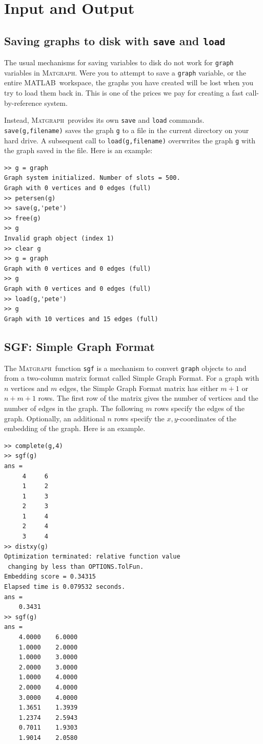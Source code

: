 \documentclass[12pt]{amsart}
\newcommand\matlab{MATLAB}
\newcommand\matgraph{\textsc{Matgraph}}
\begin{document}
\section{Input and Output}

\subsection{Saving graphs to disk with \texttt{save} and \texttt{load}}
The usual mechanisms for saving variables to disk do not work for
\verb|graph| variables in \matgraph. Were you to attempt to save a
\verb|graph| variable, or the entire \matlab\ workspace, the graphs
you have created will be lost when you try to load them back in. This
is one of the prices we pay for creating a fast call-by-reference
system. 

Instead, \matgraph\ provides its own \verb|save| and \verb|load|
commands. \verb|save(g,filename)| saves the graph \verb|g| to a file
in the current directory on your hard drive. A subsequent call to
\verb|load(g,filename)| overwrites the graph \verb|g| with the graph
saved in the file. Here is an example:
\begin{verbatim}
>> g = graph
Graph system initialized. Number of slots = 500.
Graph with 0 vertices and 0 edges (full)
>> petersen(g)
>> save(g,'pete')
>> free(g)
>> g
Invalid graph object (index 1)
>> clear g
>> g = graph
Graph with 0 vertices and 0 edges (full)
>> g
Graph with 0 vertices and 0 edges (full)
>> load(g,'pete')
>> g
Graph with 10 vertices and 15 edges (full) 
\end{verbatim}


\subsection{SGF: Simple Graph Format}
\label{sect:sgf}
The \matgraph\ function \verb|sgf| is a mechanism to convert
\verb|graph| objects to and from a two-column matrix format called
Simple Graph Format. For a graph with $n$ vertices and $m$ edges, the
Simple Graph Format matrix has either $m+1$ or $n+m+1$ rows. The first
row of the matrix gives the number of vertices and the number of edges
in the graph. The following $m$ rows specify the edges of the
graph. Optionally, an additional $n$ rows specify the
$x,y$-coordinates of the embedding of the graph. Here is an example.
\begin{verbatim}
>> complete(g,4)
>> sgf(g)
ans =
     4     6
     1     2
     1     3
     2     3
     1     4
     2     4
     3     4
>> distxy(g)
Optimization terminated: relative function value
 changing by less than OPTIONS.TolFun.
Embedding score = 0.34315
Elapsed time is 0.079532 seconds.
ans =
    0.3431
>> sgf(g)
ans =
    4.0000    6.0000
    1.0000    2.0000
    1.0000    3.0000
    2.0000    3.0000
    1.0000    4.0000
    2.0000    4.0000
    3.0000    4.0000
    1.3651    1.3939
    1.2374    2.5943
    0.7011    1.9303
    1.9014    2.0580
\end{verbatim}
\end{document}
